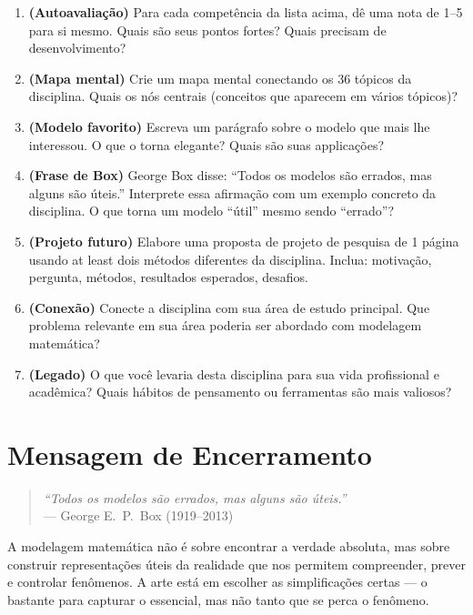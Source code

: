 \documentclass[12pt,a4paper]{article}
\begin{document}
\begin{enumerate}
  \item \textbf{(Autoavalia\c{c}\~ao)} Para cada compet\^encia da lista acima, d\^e uma nota de 1--5 para si mesmo. Quais s\~ao seus pontos fortes? Quais precisam de desenvolvimento?
  
  \item \textbf{(Mapa mental)} Crie um mapa mental conectando os 36 t\'opicos da disciplina. Quais os n\'os centrais (conceitos que aparecem em v\'arios t\'opicos)?
  
  \item \textbf{(Modelo favorito)} Escreva um par\'agrafo sobre o modelo que mais lhe interessou. O que o torna elegante? Quais s\~ao suas applica\c{c}\~oes?
  
  \item \textbf{(Frase de Box)} George Box disse: ``Todos os modelos s\~ao errados, mas alguns s\~ao \'uteis.'' Interprete essa afirma\c{c}\~ao com um exemplo concreto da disciplina. O que torna um modelo ``\'util'' mesmo sendo ``errado''?
  
  \item \textbf{(Projeto futuro)} Elabore uma proposta de projeto de pesquisa de 1 p\'agina usando at least dois m\'etodos diferentes da disciplina. Inclua: motiva\c{c}\~ao, pergunta, m\'etodos, resultados esperados, desafios.
  
  \item \textbf{(Conex\~ao)} Conecte a disciplina com sua \'area de estudo principal. Que problema relevante em sua \'area poderia ser abordado com modelagem matem\'atica?
  
  \item \textbf{(Legado)} O que voc\^e levaria desta disciplina para sua vida profissional e acad\^emica? Quais h\'abitos de pensamento ou ferramentas s\~ao mais valiosos?
\end{enumerate}

\section*{Mensagem de Encerramento}

\begin{quote}
\textit{``Todos os modelos s\~ao errados, mas alguns s\~ao \'uteis.''}\\
--- George E.\ P.\ Box (1919--2013)
\end{quote}

A modelagem matem\'atica n\~ao \'e sobre encontrar a verdade absoluta, mas sobre construir representa\c{c}\~oes \'uteis da realidade que nos permitem compreender, prever e controlar fen\^omenos. A arte est\'a em escolher as simplifica\c{c}\~oes certas --- o bastante para capturar o essencial, mas n\~ao tanto que se perca o fen\^omeno.
\end{document}
